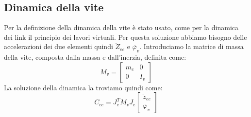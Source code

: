 \subsection{Dinamica della vite}
Per la definizione della dinamica della vite è stato usato, come per la dinamica dei link il principio dei lavori virtuali. Per questa soluzione abbiamo bisogno delle accelerazioni dei due elementi quindi $\ddot{Z}_{ee}$ e $\ddot{\varphi_v}$. Introduciamo la matrice di massa della vite, composta dalla massa e dall'inerzia, definita come:
\begin{equation}
	M_v = \begin{bmatrix}
	m_e & 0 \\ 0 & I_v
	\end{bmatrix}
\end{equation} 
La soluzione della dinamica la troviamo quindi come:
\begin{equation}
    C_{ee} = J_e^TM_v
    J_e \begin{bmatrix}
    \ddot{z}_{ee} \\ \ddot{\varphi_v}
    \end{bmatrix}
\end{equation}
